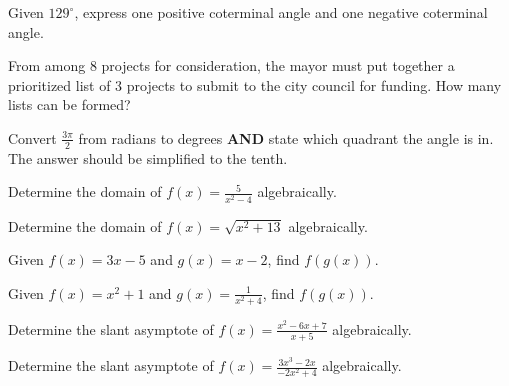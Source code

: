 \documentclass[../main.tex]{subfiles}
\begin{document}
\begin{questions}
    \newpage
    \question[1] Given $129^\circ$, express one positive coterminal angle and one negative coterminal angle.
    
    \question[1] From among 8 projects for consideration, the mayor must put together a prioritized list of 3 projects to submit to the city council for funding. How many lists can be formed? 
    
    \question[1] Convert $\frac{3\pi}{2}$ from radians to degrees \textbf{AND} state which quadrant the angle is in. The answer should be simplified to the tenth.  
    
    \question[1] Determine the domain of $f(x) = \frac{5}{x^2 - 4}$ algebraically. 
    
    \question[1] Determine the domain of $f(x) = \sqrt{x^2 + 13} $ algebraically. 
    
    \question[1] Given $f(x) = 3x - 5$ and $g(x) = x - 2$, find $f(g(x))$. 
    
    \question[1] Given $f(x) = x^2 + 1$ and $g(x) = \frac{1}{x^2 + 4}$, find $f(g(x))$. 
         
    \question[1] Determine the slant asymptote of $f(x) = \frac{x^2 - 6x + 7}{x + 5}$ algebraically. 
    
    \question[1] Determine the slant asymptote of $f(x) = \frac{3x^3 - 2x}{-2x^2 + 4}$ algebraically. 
    

\end{questions}
\end{document}
